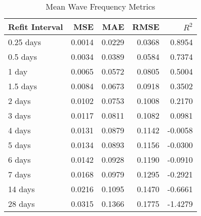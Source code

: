 \begin{table}[htbp]
    \centering
    \caption{Mean Wave Frequency Metrics}
    \label{tab:mean-wave-frequency}
    \begin{tabular}{|l|r|r|r|r|}
        \hline
        \textbf{Refit Interval} & \textbf{MSE} & \textbf{MAE} & \textbf{RMSE} & \textbf{\(R^2\)} \\
        \hline
        0.25 days & 0.0014 & 0.0229 & 0.0368 & 0.8954 \\
        0.5 days  & 0.0034 & 0.0389 & 0.0584 & 0.7374 \\
        1 day     & 0.0065 & 0.0572 & 0.0805 & 0.5004 \\
        1.5 days  & 0.0084 & 0.0673 & 0.0918 & 0.3502 \\
        2 days    & 0.0102 & 0.0753 & 0.1008 & 0.2170 \\
        3 days    & 0.0117 & 0.0811 & 0.1082 & 0.0981 \\
        4 days    & 0.0131 & 0.0879 & 0.1142 & -0.0058 \\
        5 days    & 0.0134 & 0.0893 & 0.1156 & -0.0300 \\
        6 days    & 0.0142 & 0.0928 & 0.1190 & -0.0910 \\
        7 days    & 0.0168 & 0.0979 & 0.1295 & -0.2921 \\
        14 days   & 0.0216 & 0.1095 & 0.1470 & -0.6661 \\
        28 days   & 0.0315 & 0.1366 & 0.1775 & -1.4279 \\
        \hline
    \end{tabular}
\end{table}

